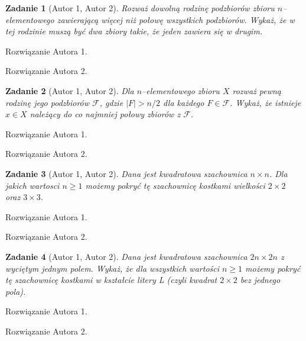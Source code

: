 \documentclass{mwart}
\newtheorem{zad}{Zadanie}[section]
\begin{document}
\begin{zad}[Autor 1, Autor 2]
    Rozważ dowolną rodzinę podzbiorów zbioru $n$--elementowego zawierającą
    więcej niż połowę wszystkich podzbiorów. Wykaż, że w tej rodzinie muszą być dwa zbiory
    takie, że jeden zawiera się w drugim.
\end{zad}
\begin{mdframed}
    Rozwiązanie Autora 1.
\end{mdframed}
\begin{mdframed}
    Rozwiązanie Autora 2.
\end{mdframed}



\begin{zad}[Autor 1, Autor 2]
    Dla $n$--elementowego zbioru $X$ rozważ pewną rodzinę jego podzbiorów
    $\mathcal{F}$, gdzie $|F| > n/2$ dla każdego $F \in \mathcal{F}$. Wykaż, że istnieje
    $x \in X$ należący do co najmniej połowy zbiorów z $\mathcal{F}$.
\end{zad}
\begin{mdframed}
    Rozwiązanie Autora 1.
\end{mdframed}
\begin{mdframed}
    Rozwiązanie Autora 2.
\end{mdframed}


\begin{zad}[Autor 1, Autor 2]
    Dana jest kwadratowa szachownica $n \times n$. Dla jakich wartosci $n\geq 1$
    możemy pokryć tę szachownicę kostkami wielkości $2 \times 2$ oraz $3 \times 3$.
\end{zad}
\begin{mdframed}
    Rozwiązanie Autora 1.
\end{mdframed}
\begin{mdframed}
    Rozwiązanie Autora 2.
\end{mdframed}


\begin{zad}[Autor 1, Autor 2]
    Dana jest kwadratowa szachownica $2n \times 2n$ z wyciętym jednym polem.
    Wykaż, że dla wszystkich wartości $n \geq 1$ możemy pokryć tę szachownicę kostkami w
    kształcie litery L (czyli kwadrat $2 \times 2$ bez jednego pola).
\end{zad}
\begin{mdframed}
    Rozwiązanie Autora 1.
\end{mdframed}
\begin{mdframed}
    Rozwiązanie Autora 2.
\end{mdframed}
\end{document}
